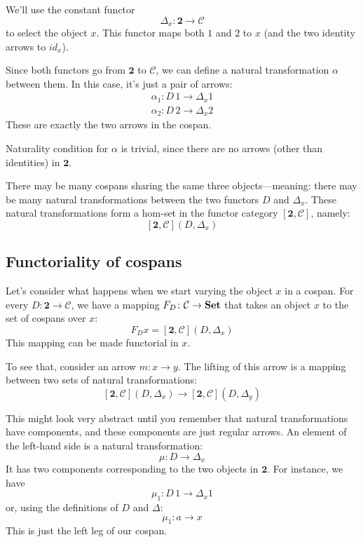 \documentclass[DaoFP]{subfiles}
\begin{document}
We'll use the constant functor 
\[ \Delta_x \colon \mathbf{2} \to \mathcal{C} \]
to select the object $x$. This functor maps both $1$ and $2$ to $x$ (and the two identity arrows to $id_x$).

Since both functors go from $\mathbf{2}$ to $\mathcal{C}$, we can define a natural transformation $\alpha$ between them. In this case, it's just a pair of arrows:
\begin{align*}
\alpha_1 \colon D \, 1 \to \Delta_x 1 \\
\alpha_2 \colon D \, 2 \to \Delta_x 2
\end{align*}
These are exactly the two arrows in the cospan. 

Naturality condition for $\alpha$ is trivial, since there are no arrows (other than identities) in $\mathbf{2}$.

There may be many cospans sharing the same three objects---meaning: there may be many natural transformations between the two functors $D$ and  $\Delta_x$. These natural transformations form a hom-set in the functor category $[\mathbf{2}, \mathcal{C}]$, namely:
\[ [\mathbf{2}, \mathcal{C}](D, \Delta_x) \]

\subsection{Functoriality of cospans}

Let's consider what happens when we start varying the object $x$ in a cospan. For every $D \colon \mathbf{2} \to \mathcal{C}$, we have a mapping $F_D \colon \mathcal{C} \to \mathbf{Set}$ that takes an object $x$ to the set of cospans over $x$:
\[ F_D x = [\mathbf{2}, \mathcal{C}](D, \Delta_x) \]
This mapping can be made functorial in $x$.

To see that, consider an arrow $m \colon x \to y$. The lifting of this arrow is a mapping between two sets of natural transformations:
\[ [\mathbf{2}, \mathcal{C}](D, \Delta_x) \to [\mathbf{2}, \mathcal{C}](D, \Delta_{y}) \] 
 
This might look very abstract until you remember that natural transformations have components, and these components are just regular arrows. An element of the left-hand side is a natural transformation:
\[ \mu \colon D \to \Delta_x \]
It has two components corresponding to the two objects in $\mathbf{2}$. For instance, we have
\[ \mu_1 \colon D \, 1 \to \Delta_x 1 \]
or, using the definitions of $D$ and $\Delta$:
\[ \mu_1 \colon a \to x \]
This is just the left leg of our cospan. 
\end{document}
